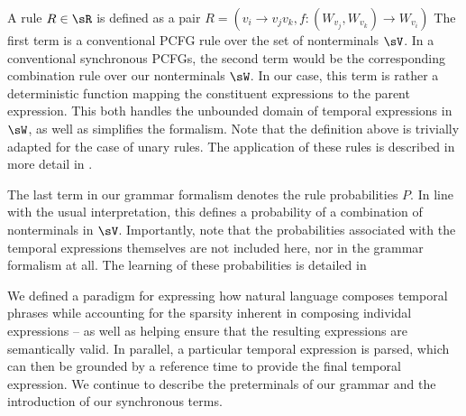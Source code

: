 A rule $R \in \sR$ is defined as a pair 
	$R = \left(v_i \rightarrow v_jv_k, 
		f : (W_{v_j},W_{v_k}) \rightarrow W_{v_i}\right)$
The first term is a conventional PCFG rule over the set of nonterminals
	$\sV$.
In a conventional synchronous PCFGs, the second term would be the corresponding
	combination rule over our nonterminals $\sW$.
In our case, this term is rather a deterministic function mapping the
	constituent expressions to the parent expression.
This both handles the unbounded domain of temporal expressions in $\sW$,
	as well as simplifies the formalism.
Note that the definition above is trivially adapted for the case of unary
	rules.
The application of these rules is described in more detail in 
	.

The last term in our grammar formalism denotes the rule probabilities $P$.
In line with the usual interpretation, this defines a probability
	of a combination of nonterminals in $\sV$.
Importantly, note that the probabilities associated with the temporal
	expressions themselves are not included here, nor in the grammar
	formalism at all.
The learning of these probabilities is detailed in 

We defined a paradigm for expressing how natural language composes
	temporal phrases while accounting for the sparsity inherent in composing
	individal expressions -- as well as helping ensure that the resulting
	expressions are semantically valid.
In parallel, a particular temporal expression is parsed, which can then
	be grounded by a reference time to provide the final temporal expression.
We continue to describe the preterminals of our grammar and the introduction
	of our synchronous terms.


